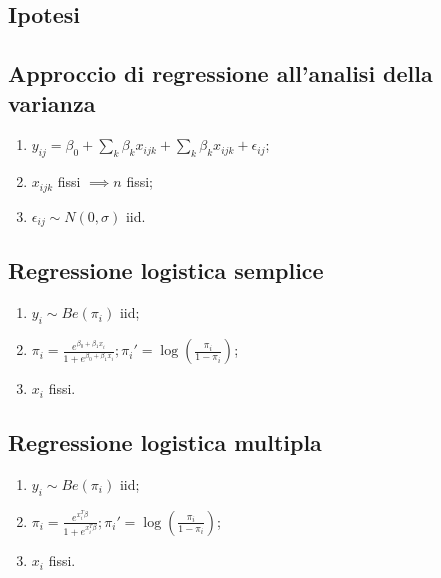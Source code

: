 \documentclass[a4paper, landscape]{article}
\begin{document}
\begin{multicols}{3}
\section{Ipotesi}
\subsection{Approccio di regressione all'analisi della varianza}
\begin{enumerate}
	\item $y_{ij} = \beta_0 + \sum_k \beta_k x_{ijk} + \sum_k \beta_k x_{ijk} + \epsilon_{ij}$;
	\item $x_{ijk}$ fissi $\implies n $ fissi;
	\item $\epsilon_{ij} \sim N(0, \sigma)$ iid.
\end{enumerate}
\subsection{Regressione logistica semplice}
\begin{enumerate}
	\item $y_i \sim Be(\pi_i)$ iid;
	\item $\pi_i = \frac{e^{\beta_0 + \beta_1 x_i}}{1 + e^{\beta_0 + \beta_1 x_i}}; \pi_i' = \log(\frac{\pi_i}{1 - \pi_i})$;
	\item $x_i$ fissi.
\end{enumerate}
\subsection{Regressione logistica multipla}
\begin{enumerate}
	\item $y_i \sim Be(\pi_i)$ iid;
	\item $\pi_i = \frac{e^{x_i^T \beta}}{1 + e^{x_i^T \beta}}; \pi_i' = \log(\frac{\pi_i}{1 - \pi_i})$;
	\item $x_i$ fissi.
\end{enumerate}
\end{multicols}
\end{document}
